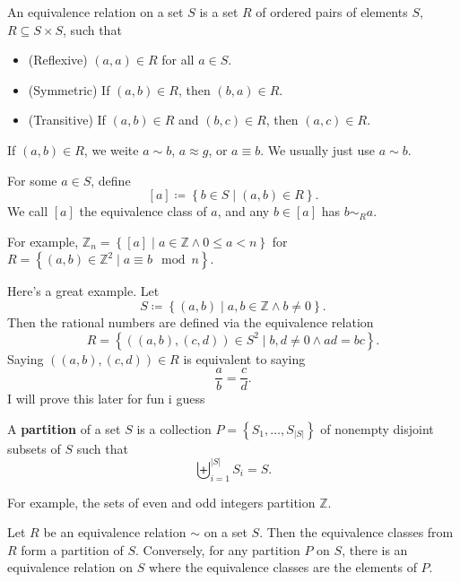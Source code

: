\begin{definition}\label{dfn:jsd}
	An equivalence relation on a set $S$ is a set $R$ of ordered pairs of elements $S$, $R\subseteq S\times S$, such that
	\begin{itemize}
		\item (Reflexive) $(a,a)\in R$ for all $a\in S$.
		\item (Symmetric) If $(a,b)\in R$, then $(b,a)\in R$.
		\item (Transitive) If $(a,b)\in R$ and $(b,c)\in R$, then $(a,c)\in R$.
	\end{itemize}
\end{definition}
If $(a,b)\in R$, we weite $a\sim b$, $a\approx g$, or $a\equiv b$. We usually just use $a\sim b$.
\begin{definition}\label{dfn:aaa}
	For some $a\in S$, define
	\[
		[a]\coloneqq \left\{ b\in S \mid (a,b)\in R \right\} 
	.\]
	We call $[a]$ the equivalence class of $a$, and any $b\in [a]$ has $b\sim_R a$.
\end{definition}
For example, $\mathbb{Z}_n=\left\{ [a] \mid a\in\mathbb{Z}\land 0\leq a<n \right\} $ for $R=\left\{ (a,b)\in\mathbb{Z}^2 \mid a\equiv b\mod{n} \right\} $.

Here's a great example. Let
\[
	S\coloneqq \left\{ (a,b) \mid a,b\in\mathbb{Z}\land b\neq 0 \right\} 
.\]
Then the rational numbers are defined via the equivalence relation
\[
	R=\left\{ ((a,b),(c,d))\in S^2 \mid b,d\neq 0\land ad=bc \right\} 
.\]
Saying $((a,b),(c,d))\in R$ is equivalent to saying
\[
	\frac{a}{b}=\frac{c}{d}
.\]
I will prove this later for fun i guess
\begin{definition}[Partition]\label{dfn:kasj}
	A \textbf{partition} of a set $S$ is a collection $P=\left\{ S_1, \ldots,S_{\left| S \right| } \right\}  $ of nonempty disjoint subsets of $S$ such that
	\[
		\biguplus_{i=1}^{|S|} S_i=S
	.\]
\end{definition}
For example, the sets of even and odd integers partition $\mathbb{Z}$.

\begin{theorem}\label{thm:dsjk}
	Let $R $ be an equivalence relation $\sim $ on a set $S$. Then the equivalence classes from $R$ form a partition of $S$. Conversely, for any partition $P$ on $S$, there is an equivalence relation on $S$ where the equivalence classes are the elements of $P$.
\end{theorem}
